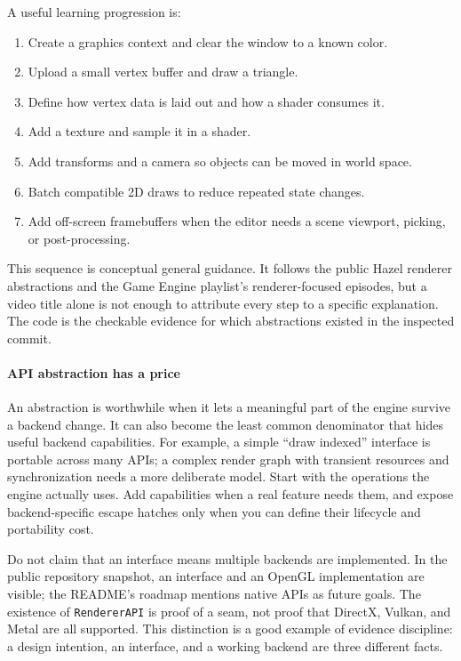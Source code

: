 A useful learning progression is:

\begin{enumerate}
\def\labelenumi{\arabic{enumi}.}
\tightlist
\item
  Create a graphics context and clear the window to a known color.
\item
  Upload a small vertex buffer and draw a triangle.
\item
  Define how vertex data is laid out and how a shader consumes it.
\item
  Add a texture and sample it in a shader.
\item
  Add transforms and a camera so objects can be moved in world space.
\item
  Batch compatible 2D draws to reduce repeated state changes.
\item
  Add off-screen framebuffers when the editor needs a scene viewport, picking, or post-processing.
\end{enumerate}

This sequence is conceptual general guidance. It follows the public Hazel renderer abstractions and the Game Engine playlist's renderer-focused episodes, but a video title alone is not enough to attribute every step to a specific explanation. The code is the checkable evidence for which abstractions existed in the inspected commit.

\paragraph{API abstraction has a price}\label{api-abstraction-has-a-price}

An abstraction is worthwhile when it lets a meaningful part of the engine survive a backend change. It can also become the least common denominator that hides useful backend capabilities. For example, a simple ``draw indexed'' interface is portable across many APIs; a complex render graph with transient resources and synchronization needs a more deliberate model. Start with the operations the engine actually uses. Add capabilities when a real feature needs them, and expose backend-specific escape hatches only when you can define their lifecycle and portability cost.

Do not claim that an interface means multiple backends are implemented. In the public repository snapshot, an interface and an OpenGL implementation are visible; the README's roadmap mentions native APIs as future goals. The existence of \texttt{RendererAPI} is proof of a seam, not proof that DirectX, Vulkan, and Metal are all supported. This distinction is a good example of evidence discipline: a design intention, an interface, and a working backend are three different facts.

